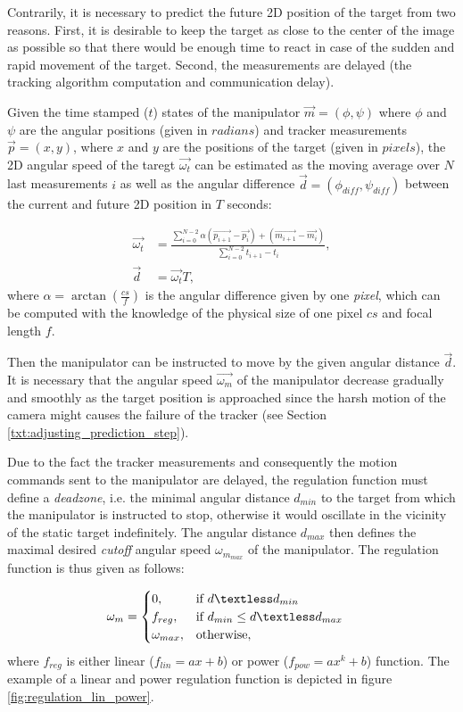 Contrarily, it is necessary to predict the future 2D position of the target from two reasons. First, it is desirable to keep the target as close to the center of the image as possible so that there would be enough time to react in case of the sudden and rapid movement of the target. Second, the measurements are delayed (the tracking algorithm computation and communication delay).

Given the time stamped ($t$) states of the manipulator $\vec{m} = (\phi, \psi)$ where $\phi$ and $\psi$ are the angular positions (given in $radians$) and tracker measurements $\vec{p} = (x, y)$, where $x$ and $y$ are the positions of the target (given in $pixels$), the 2D angular speed of the taregt $\vec{\omega_{t}}$ can be estimated as the moving average over $N$ last measurements $i$ as well as the angular difference $\vec{d} = (\phi_{diff}, \psi_{diff})$ between the current and future 2D position in $T$ seconds:

\begin{align}
	\vec{\omega_{t}} &= \frac{\sum_{i=0}^{N-2}{\alpha(\vec{p_{i+1}} - \vec{p_{i}}) + (\vec{m_{i+1}} - \vec{m_{i}})}}{\sum_{i=0}^{N-2}{t_{i+1} - t_{i}}},\\
	\vec{d} &= \vec{\omega_{t}}T,
\end{align}
where $\alpha = \arctan{(\frac{cs}{f})}$ is the angular difference given by one \textit{pixel}, which can be computed with the knowledge of the physical size of one pixel $cs$ and focal length $f$.

Then the manipulator can be instructed to move by the given angular distance $\vec{d}$. It is necessary that the angular speed $\vec{\omega_{m}}$ of the manipulator decrease gradually and smoothly as the target position is approached since the harsh motion of the camera might causes the failure of the tracker (see Section \ref{txt:adjusting_prediction_step}).

Due to the fact the tracker measurements and consequently the motion commands sent to the manipulator are delayed, the regulation function must define a \textit{deadzone}, i.e. the minimal angular distance $d_{min}$ to the target from which the manipulator is instructed to stop, otherwise it would oscillate in the vicinity of the static target indefinitely. The angular distance $d_{max}$ then defines the maximal desired \textit{cutoff} angular speed $\omega_{m_{max}}$ of the manipulator. The regulation function is thus given as follows:

\begin{align}
	\omega_{m} &=
	\begin{cases}
		0,  & \text{if}\ d \textless d_{min}\\
		f_{reg},  & \text{if}\ d_{min} \leq d \textless d_{max}\\
		\omega_{max}, & \text{otherwise},
	\end{cases}
\end{align}
where $f_{reg}$ is either linear ($f_{lin} = ax+b$) or power ($f_{pow} = ax^{k}+b$) function. The example of a linear and power regulation function is depicted in figure \ref{fig:regulation_lin_power}.

